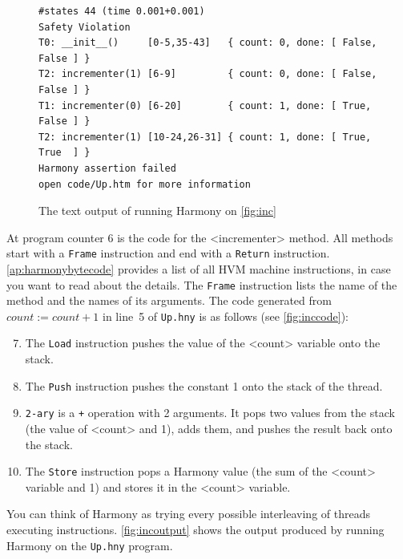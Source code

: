 \documentclass{report}
\newenvironment{code}{
\tcolorbox
}{
\endtcolorbox
}
\begin{document}
\begin{figure}
\begin{code}
\begin{verbatim}
#states 44 (time 0.001+0.001)
Safety Violation
T0: __init__()     [0-5,35-43]   { count: 0, done: [ False, False ] }
T2: incrementer(1) [6-9]         { count: 0, done: [ False, False ] }
T1: incrementer(0) [6-20]        { count: 1, done: [ True,  False ] }
T2: incrementer(1) [10-24,26-31] { count: 1, done: [ True,  True  ] }
Harmony assertion failed
open code/Up.htm for more information
\end{verbatim}
\end{code}
\caption{The text output of running Harmony on \autoref{fig:inc}}
\label{fig:incoutput}
\end{figure}

At program counter 6 is the code for the <{incrementer}> method.
All methods start with a \texttt{Frame} instruction and end with a
\texttt{Return} instruction.
\autoref{ap:harmonybytecode} provides a list of all HVM machine instructions,
in case you want to read about the details.
The \texttt{Frame} instruction lists the name of the method and the
names of its arguments.
The code generated from $\mathit{count} := \mathit{count} + 1$ in line~5 of
\texttt{Up.hny} is as follows (see \autoref{fig:inccode}):

\begin{enumerate} \setcounter{enumi}{6}
\item The \texttt{Load} instruction pushes the value of the
<{count}> variable onto the stack.
\item The \texttt{Push} instruction pushes the constant 1
onto the stack of the thread.
\item \texttt{2-ary} is a \texttt{+} operation with 2 arguments.
It pops two values from the stack (the value of <{count}> and 1),
adds them, and pushes the result back onto the stack.
\item The \texttt{Store} instruction pops
a Harmony value (the sum of the <{count}> variable and 1) and
stores it in the <{count}> variable.
\end{enumerate}

You can think of Harmony as trying every possible interleaving of threads executing
instructions.
\autoref{fig:incoutput} shows the output produced by running Harmony on the
\texttt{Up.hny} program.
\end{document}
